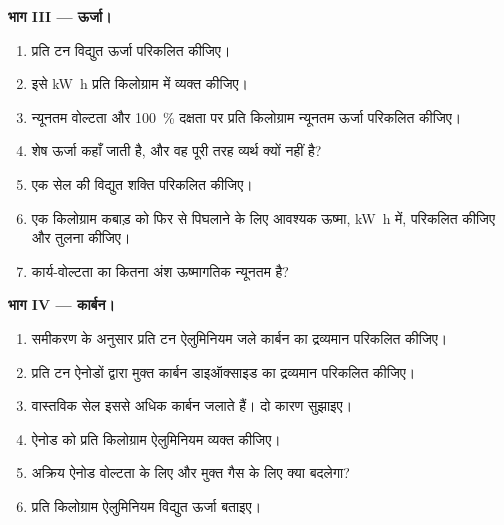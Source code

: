 \begin{problem}
\medskip
\noindent\textbf{भाग III --- ऊर्जा।}
\begin{enumerate}[resume]
  \item प्रति टन विद्युत ऊर्जा परिकलित कीजिए।
  \item इसे \unit{kW.h} प्रति किलोग्राम में व्यक्त कीजिए।
  \item न्यूनतम वोल्टता और 100~\% दक्षता पर प्रति किलोग्राम न्यूनतम ऊर्जा
        परिकलित कीजिए।
  \item शेष ऊर्जा कहाँ जाती है, और वह पूरी तरह व्यर्थ
        क्यों नहीं है?
  \item एक सेल की विद्युत शक्ति परिकलित कीजिए।
  \item एक किलोग्राम कबाड़ को फिर से पिघलाने के लिए आवश्यक ऊष्मा,
        \unit{kW.h} में, परिकलित कीजिए और तुलना कीजिए।
  \item कार्य-वोल्टता का कितना अंश ऊष्मागतिक न्यूनतम है?
\end{enumerate}

\medskip
\noindent\textbf{भाग IV --- कार्बन।}
\begin{enumerate}[resume]
  \item समीकरण के अनुसार प्रति टन ऐलुमिनियम जले कार्बन का द्रव्यमान
        परिकलित कीजिए।
  \item प्रति टन ऐनोडों द्वारा मुक्त कार्बन डाइऑक्साइड का द्रव्यमान परिकलित कीजिए।
  \item वास्तविक सेल इससे अधिक कार्बन जलाते हैं। दो कारण सुझाइए।
  \item ऐनोड  को प्रति किलोग्राम ऐलुमिनियम व्यक्त कीजिए।
  \item अक्रिय ऐनोड वोल्टता के लिए और मुक्त गैस के लिए
        क्या बदलेगा?
  \item प्रति किलोग्राम ऐलुमिनियम विद्युत ऊर्जा बताइए।
\end{enumerate}
\end{problem}
